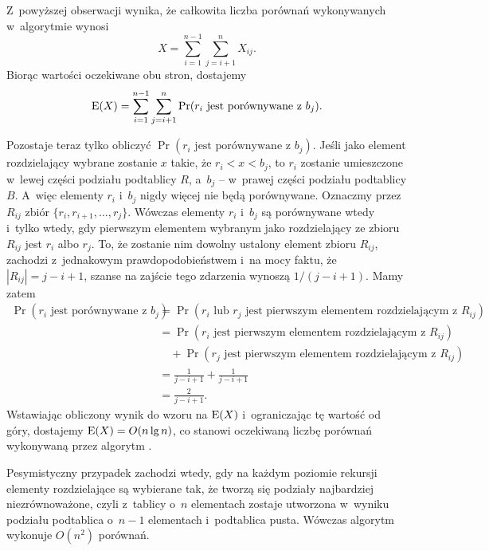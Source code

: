 Z~powyższej obserwacji wynika, że całkowita liczba porównań wykonywanych w~algorytmie wynosi
\[
    X = \sum_{i=1}^{n-1}\sum_{j=i+1}^nX_{ij}.
\]
Biorąc wartości oczekiwane obu stron, dostajemy
\[
    \operatorname{E}(X) = \sum_{i=1}^{n-1}\sum_{j=i+1}^n\Pr(\text{$r_i$ jest porównywane z~$b_j$}).
\]

Pozostaje teraz tylko obliczyć $\Pr(\text{$r_i$ jest porównywane z~$b_j$})$.
Jeśli jako element rozdzielający wybrane zostanie $x$ takie, że $r_i<x<b_j$, to $r_i$ zostanie umieszczone w~lewej części podziału podtablicy $R$, a~$b_j$ -- w~prawej części podziału podtablicy $B$.
A~więc elementy $r_i$ i~$b_j$ nigdy więcej nie będą porównywane.
Oznaczmy przez $R_{ij}$ zbiór $\{r_i,r_{i+1},\dots,r_j\}$.
Wówczas elementy $r_i$ i~$b_j$ są porównywane wtedy i~tylko wtedy, gdy pierwszym elementem wybranym jako rozdzielający ze zbioru $R_{ij}$ jest $r_i$ albo $r_j$.
To, że zostanie nim dowolny ustalony element zbioru $R_{ij}$, zachodzi z~jednakowym prawdopodobieństwem i~na mocy faktu, że $|R_{ij}|=j-i+1$, szanse na zajście tego zdarzenia wynoszą $1/(j-i+1)$.
Mamy zatem
\begin{align*}
    \Pr(\text{$r_i$ jest porównywane z~$b_j$}) &= \Pr(\text{$r_i$ lub $r_j$ jest pierwszym elementem rozdzielającym z~$R_{ij}$}) \\
	&= \Pr(\text{$r_i$ jest pierwszym elementem rozdzielającym z~$R_{ij}$}) \\
	&\quad {}+\Pr(\text{$r_j$ jest pierwszym elementem rozdzielającym z~$R_{ij}$}) \\
	&= \frac{1}{j-i+1}+\frac{1}{j-i+1} \\
	&= \frac{2}{j-i+1}.
\end{align*}
Wstawiając obliczony wynik do wzoru na $\operatorname{E}(X)$ i~ograniczając tę wartość od góry, dostajemy $\operatorname{E}(X)=O(n\lg n)$, co stanowi oczekiwaną liczbę porównań wykonywaną przez algorytm .

Pesymistyczny przypadek zachodzi wtedy, gdy na każdym poziomie rekursji elementy rozdzielające są wybierane tak, że tworzą się podziały najbardziej niezrównoważone, czyli z~tablicy o~$n$ elementach zostaje utworzona w~wyniku podziału podtablica o~$n-1$ elementach i~podtablica pusta.
Wówczas algorytm wykonuje $O(n^2)$ porównań.
